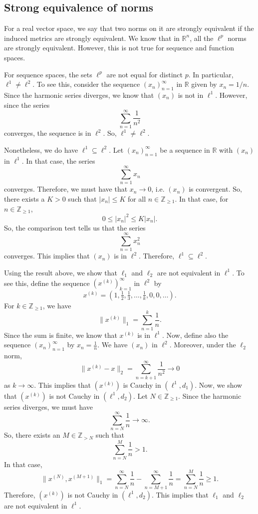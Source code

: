 \documentclass[a4paper, openany]{memoir}
\theoremstyle{definition}
\theoremstyle{plain}
\begin{document}
\subsection{Strong equivalence of norms}
For a real vector space, we say that two norms on it are strongly equivalent if the induced metrics are strongly equivalent. We know that in $\mathbb{R}^n$, all the $\ell^p$ norms are strongly equivalent. However, this is not true for sequence and function spaces.

For sequence spaces, the sets $\ell^p$ are not equal for distinct $p$. In particular, $\ell^1 \neq \ell^2$. To see this, consider the sequence $(x_n)_{n=1}^\infty$ in $\mathbb{R}$ given by $x_n = 1/n$. Since the harmonic series diverges, we know that $(x_n)$ is not in $\ell^1$. However, since the series
\[\sum_{n=1}^\infty \frac{1}{n^2}\]
converges, the sequence is in $\ell^2$. So, $\ell^1 \neq \ell^2$. 

Nonetheless, we do have $\ell^1 \subseteq \ell^2$. Let $(x_n)_{n=1}^\infty$ be a sequence in $\mathbb{R}$ with $(x_n)$ in $\ell^1$. In that case, the series
\[\sum_{n=1}^\infty x_n\]
converges. Therefore, we must have that $x_n \to 0$, i.e. $(x_n)$ is convergent. So, there exists a $K > 0$ such that $|x_n| \leq K$ for all $n \in \mathbb{Z}_{\geq 1}$. In that case, for $n \in \mathbb{Z}_{\geq 1}$,
\[0 \leq |x_n|^2 \leq K|x_n|.\]
So, the comparison test tells us that the series
\[\sum_{n=1}^\infty x_n^2\]
converges. This implies that $(x_n)$ is in $\ell^2$. Therefore, $\ell^1 \subseteq \ell^2$. 

Using the result above, we show that $\ell_1$ and $\ell_2$ are not equivalent in $\ell^1$. To see this, define the sequence $(x^{(k)})_{k=1}^\infty$ in $\ell^2$ by
\[x^{(k)} = (1, \tfrac{1}{2}, \tfrac{1}{3}, \dots, \tfrac{1}{k}, 0, 0, \dots).\]
For $k \in \mathbb{Z}_{\geq 1}$, we have
\[\lVert x^{(k)} \rVert_1 = \sum_{n=1}^k \frac{1}{n}.\]
Since the sum is finite, we know that $x^{(k)}$ is in $\ell^1$. Now, define also the sequence $(x_n)_{n=1}^\infty$ by $x_n = \frac{1}{n}$. We have $(x_n)$ in $\ell^2$. Moreover, under the $\ell_2$ norm,
\[\lVert x^{(k)} - x \rVert_2 = \sum_{n=k+1}^\infty \frac{1}{n^2} \to 0\]
as $k \to \infty$. This implies that $(x^{(k)})$ is Cauchy in $(\ell^1, d_1)$. Now, we show that $(x^{(k)})$ is not Cauchy in $(\ell^1, d_2)$. Let $N \in \mathbb{Z}_{\geq 1}$. Since the harmonic series diverges, we must have
\[\sum_{n=N}^\infty \frac{1}{n} \to \infty.\]
So, there exists an $M \in \mathbb{Z}_{> N}$ such that
\[\sum_{n=N}^M \frac{1}{n} > 1.\]
In that case,
\[\lVert x^{(N)}, x^{(M+1)} \rVert_1 = \sum_{n=N}^\infty \frac{1}{n} - \sum_{n=M+1}^\infty \frac{1}{n} = \sum_{n=N}^M \frac{1}{n} \geq 1.\]
Therefore, $(x^{(k)})$ is not Cauchy in $(\ell^1, d_2)$. This implies that $\ell_1$ and $\ell_2$ are not equivalent in $\ell^1$.
\end{document}
